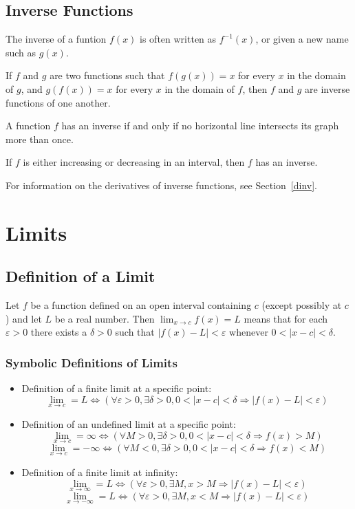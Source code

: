 \documentclass{artikel3}
\begin{document}
\subsection{Inverse Functions}
The inverse of a funtion $f(x)$ is often written as $f^{-1}(x)$, or given 
a new name such as $g(x)$.

If $f$ and $g$ are two functions such that $f(g(x))=x$ for every $x$ in 
the domain of $g$, and $g(f(x))=x$ for every $x$ in the domain of $f$, then
$f$ and $g$ are inverse functions of one another.

A function $f$ has an inverse if and only if no horizontal line intersects its graph more than once.

If $f$ is either increasing or decreasing in an interval, then $f$ has an inverse.

For information on the derivatives of inverse functions, see Section~\ref{dinv}.

\section{Limits}

\subsection{Definition of a Limit}
Let $f$ be a function defined on an open interval containing $c$ 
(except possibly at $c$) and let $L$ be a real number.
Then $\lim_{x \to c} f(x)=L$ means that for each $\varepsilon >0$
there exists a $\delta >0$ such that $|f(x)-L|<\varepsilon$ whenever
$0<|x-c|<\delta$.

\subsubsection{Symbolic Definitions of Limits}
\begin{itemize}
\item{Definition of a finite limit at a specific point:
\[ \lim_{x \to c}=L\Leftrightarrow (\forall\varepsilon >0, \exists\delta >0, 
0<|x-c|<\delta \Rightarrow |f(x)-L|<\varepsilon)\]}
\item{Definition of an undefined limit at a specific point:
\[ \lim_{x \to c}=\infty\Leftrightarrow (\forall M>0, \exists\delta >0,
0<|x-c|<\delta\Rightarrow f(x)>M)\]
\[ \lim_{x \to c}=-\infty\Leftrightarrow (\forall M<0, \exists\delta >0,
0<|x-c|<\delta\Rightarrow f(x)<M)\]}
\item{Definition of a finite limit at infinity:
\[ \lim_{x \to \infty}=L\Leftrightarrow (\forall\varepsilon>0,\exists M,
x>M\Rightarrow|f(x)-L|<\varepsilon) \]
\[ \lim_{x \to -\infty}=L\Leftrightarrow (\forall\varepsilon>0,\exists M,
x<M\Rightarrow|f(x)-L|<\varepsilon) \]}
\end{itemize}
\end{document}
